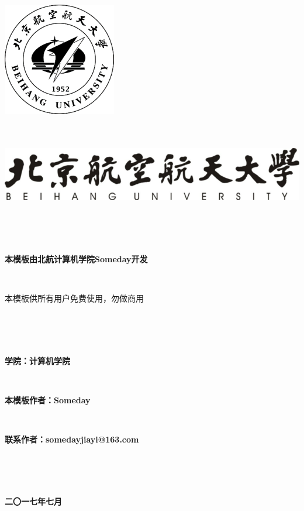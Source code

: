 \documentclass{ctexart}
\newcommand{\erhao}{\fontsize{21pt}{0}}
\newcommand{\sanhao}{\fontsize{15.75pt}{0}}
\newcommand{\sihao}{\fontsize{14pt}{0}}
\begin{document}
\lhead{}%
\rhead{}%


\setcounter{secnumdepth}{0}%





\includegraphics[scale=1]{include_picture/xiaohui.png}
\ \\ 
\ \\
\ \\
\begin{center}
\includegraphics[scale=1]{include_picture/xiaoming.png}
\end{center}
\ \\
\ \\
\ \\
\erhao
\centerline{\erhao\textbf{本模板由北航计算机学院Someday开发}} %
\ \\
\centerline{本模板供所有用户免费使用，勿做商用}
\ \\
\ \\
\ \\
\sihao
\centerline{\textbf{学院：计算机学院}}
\ \\
\centerline{\textbf{本模板作者：Someday}}
\ \\
\centerline{\textbf{联系作者：somedayjiayi@163.com}}
\ \\
\ \\ 
\ \\
\sanhao
\centerline{\textbf{二〇一七年七月}}
\end{document}
